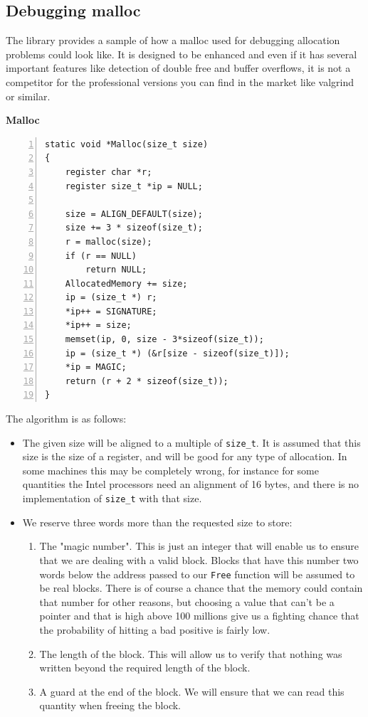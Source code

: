 \documentclass[12pt,a4paper]{memoir} %
\newif\iftth
\newcommand{\container}{}
\newcommand{\function}[1] {%
\vspace{0.2in}
\par\noindent
\textbf{#1}\index{#1!code for \container} \hrulefill
\iftth\else
\nopagebreak
\fi
\noindent\begin{Verbatim}[numbers=left, xleftmargin=7mm]}
\begin{document}
{{\subsection{Debugging malloc}
\label{Malloc}
\renewcommand{\container}{debugMalloc}
The library provides a sample of how a malloc used for debugging allocation problems could look like. It is designed to be enhanced and even if it
has several important features like detection of double free and buffer overflows, it is not a competitor for the professional versions you can find
in the market like valgrind or similar.
\function{Malloc}
static void *Malloc(size_t size)
{
    register char *r;
    register size_t *ip = NULL;

    size = ALIGN_DEFAULT(size);
    size += 3 * sizeof(size_t);
    r = malloc(size);
    if (r == NULL)
        return NULL;
    AllocatedMemory += size;
    ip = (size_t *) r;
    *ip++ = SIGNATURE;
    *ip++ = size;
    memset(ip, 0, size - 3*sizeof(size_t));
    ip = (size_t *) (&r[size - sizeof(size_t)]);
    *ip = MAGIC;
    return (r + 2 * sizeof(size_t));
}
\end{Verbatim}
The algorithm is as follows:
\begin{itemize}
\item The given size will be aligned to a multiple of \texttt{size\_t}. It is assumed that this size is the size of a register, and will be 
good for any type of allocation. In some machines this may be completely wrong, for instance for some quantities the Intel processors need an
alignment of 16 bytes, and there is no implementation of \texttt{size\_t} with that size.
\item We reserve three words more than the requested size to store:
\begin{enumerate}
\item The "magic number". This is just an integer that will enable us to ensure that we are dealing with a valid block. Blocks that have this number two 
words below the address passed to our \texttt{Free} function will be assumed to be real blocks. There 
is of course a chance that the memory
could contain that number for other reasons, but choosing a value that can't be a pointer and that is high above 100 millions give us a fighting chance 
that the
probability of hitting a bad positive is fairly low.
\item The length of the block. This will allow us to verify that nothing was written beyond the required length of the block.
\item A guard at the end of the block. We will ensure that we can read this quantity when freeing the block.

\end{enumerate}
\end{itemize}}}
\end{document}
